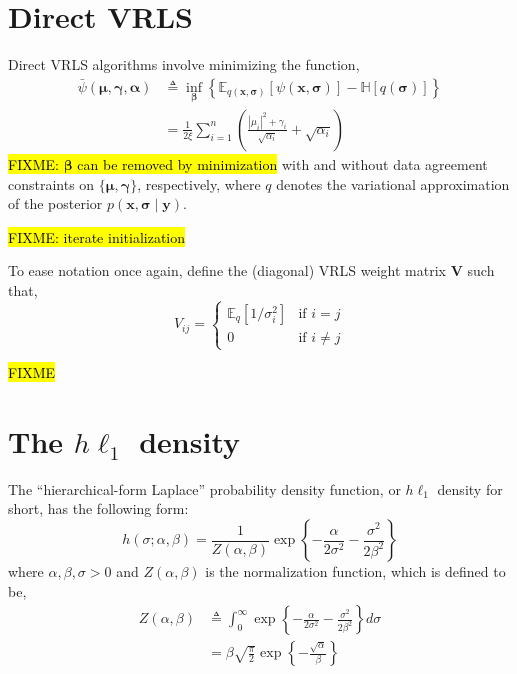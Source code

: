 \documentclass{article}
\newcommand{\m}[1]{\boldsymbol{#1}}
\newcommand{\E}[2]{\mathbb{E}_{#2}\left[ #1 \right]}
\newcommand{\entropy}[1]{\mathbb{H}\left[ #1 \right]}
\begin{document}
\section{Direct VRLS}
\label{s:vrls}
Direct VRLS algorithms involve minimizing the function,
\begin{equation}
\begin{aligned}
\bar\psi(\m{\mu}, \m{\gamma}, \m{\alpha}) &\triangleq
 \inf_{\m{\beta}} \left\{
  \E{\psi(\m{x}, \m{\sigma})}{q(\m{x}, \m{\sigma})} -
  \entropy{q(\m{\sigma})}
 \right\}
\\ &=
 \frac{1}{2 \xi} \sum_{i=1}^n \left(
  \frac{|\mu_i|^2 + \gamma_i}{\sqrt{\alpha_i}} + \sqrt{\alpha_i}
 \right)
\end{aligned}
\label{eq:psibar}
\end{equation}
\hl{FIXME: $\m{\beta}$ can be removed by minimization}
with and without data agreement constraints on $\{\m{\mu}, \m{\gamma}\}$,
respectively, where $q$ denotes the variational approximation of the
posterior $p(\m{x}, \m{\sigma} \mid \m{y})$.

\hl{FIXME: iterate initialization}

To ease notation once again, define
the (diagonal) VRLS weight matrix $\m{V}$ such that,
\begin{equation}
V_{ij} = \begin{cases}
 \E{1 / \sigma_i^2}{q} &\text{if } i = j \\
 0 &\text{if } i \ne j
\end{cases}
\label{eq:vmatrix}
\end{equation}

\hl{FIXME}

\section{The $h\ell_1$ density}
\label{s:hprior}
The ``hierarchical-form Laplace'' probability density function,
or $h\ell_1$ density for short, has the following form:
\begin{equation}
h(\sigma; \alpha, \beta) =
 \frac{1}{Z(\alpha, \beta)}
 \exp\left\{
  -\frac{\alpha}{2 \sigma^2}
  -\frac{\sigma^2}{2 \beta^2}
 \right\}
\label{eq:hprior}
\end{equation}
where $\alpha, \beta, \sigma > 0$ and $Z(\alpha, \beta)$ is the
normalization function, which is defined to be,
\begin{equation}
\begin{aligned}
Z(\alpha, \beta) &\triangleq
 \int_0^\infty \exp\left\{
  -\frac{\alpha}{2 \sigma^2}
  -\frac{\sigma^2}{2 \beta^2}
 \right\} d\sigma
\\ &=
 \beta \sqrt{\frac{\pi}{2}}
 \exp\left\{ -\frac{\sqrt{\alpha}}{\beta} \right\}
\end{aligned}
\label{eq:hprior_z}
\end{equation}
\end{document}
